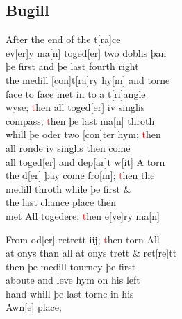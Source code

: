 \documentclass[12pt,letter]{article} %
\newcommand{\red}[1]{\textcolor{red}{#1}}
\newcommand{\srcpg}[1]{
    \noindent{
        \color{Gray}{\rule[0.5ex]{\linewidth}{1pt}~#1} 
        \\
    }
}
\begin{document}
\subsection{Bugill}
After the end of the t{[}ra{]}ce\\
ev{[}er{]}y ma{[}n{]} toged{[}er{]} two doblis þan \\
þe first and þe last fourth right \\
the medill {[}con{]}t{[}ra{]}ry hy{[}m{]} and torne \\
face to face met in to a t{[}ri{]}angle \\
wyse; \red{t}hen all toged{[}er{]} iv singlis \\
compass; \red{t}hen þe last ma{[}n{]} throth \\
whill þe oder two {[}con{]}ter hym; \red{t}hen \\
all ronde iv singlis then come \\
all toged{[}er{]} and dep{[}ar{]}t w{[}it{]} A torn\\
the d{[}er{]} þay come fro{[}m{]}; \red{t}hen the \\
medill throth while þe first \& \\
the last chance place then \\
met All togedere; \red{t}hen e{[}ve{]}ry ma{[}n{]} \srcpg{59} 
From od{[}er{]} retrett iij; \red{t}hen torn All\\
at onys than all at onys trett \& ret{[}re{]}tt\\
then þe medill tourney þe first\\
aboute and leve hym on his left\\
hand whill þe last torne in his\\
Awn{[}e{]} place;
\end{document}
